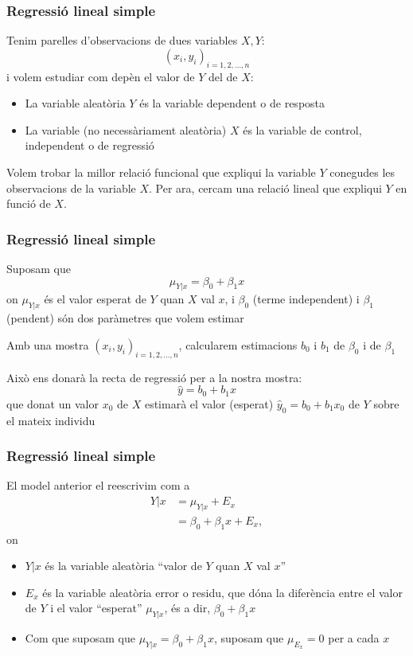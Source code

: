 \documentclass[12pt,t]{beamer}
\renewcommand{\emph}[1]{{\color{red}#1}}
\theoremstyle{plain}
\theoremstyle{definition}
\begin{document}
\begin{frame}
\frametitle{Regressió lineal simple}
Tenim parelles d'observacions de dues variables $X,Y$:
$$
(x_i,y_i)_{i=1,2,\ldots,n}
$$
i volem estudiar com depèn el valor de $Y$ del de $X$:
\medskip

\begin{itemize}
\item La variable aleatòria $Y$ és la variable \emph{dependent} o \emph{de resposta}

\item La variable (no necessàriament aleatòria) $X$ és la variable \emph{de control},
\emph{independent} o \emph{de regressió}
\end{itemize}
\bigskip

Volem trobar la millor relació funcional que  expliqui la variable $Y$ conegudes les observacions de la
variable $X$. Per ara, cercam una \emph{relació lineal} que expliqui $Y$ en funció de $X$.
\end{frame}

\begin{frame}
\frametitle{Regressió lineal simple}

Suposam que 
$$
\mu_{Y|x}=\beta_0+\beta_1 x
$$
on $\mu_{Y|x}$ és el valor esperat de $Y$ quan $X$ val $x$, i $\beta_0$
(\emph{terme independent}) i $\beta_1$ (\emph{pendent}) són dos
paràmetres que volem estimar
\medskip

Amb una mostra $(x_i,y_i)_{i=1,2,\ldots,n}$, calcularem estimacions $b_0$ i $b_1$ de
$\beta_0$ i de $\beta_1$
\medskip

Això ens donarà la \emph{recta de regressió} per a la nostra mostra:
$$
\widehat{y}=b_0+b_1 x
$$
que donat un valor $x_0$ de $X$ estimarà el valor (esperat) $\widehat{y}_0=b_0+b_1 x_0$ de $Y$ sobre el mateix individu
\end{frame}

\begin{frame}
\frametitle{Regressió lineal simple}

El model anterior el reescrivim com a
$$
\begin{array}{rl}
Y|x &=\mu_{Y|x}+ E_x\\
&=\beta_0+\beta_1 x+ E_x,
\end{array}
$$
on
\begin{itemize}
\item $Y|x$ és la variable aleatòria ``valor de $Y$ quan $X$ val $x$''
\medskip

\item $E_x$ és la variable aleatòria \emph{error} o \emph{residu}, que dóna la diferència entre el valor de $Y$ i el valor ``esperat'' $\mu_{Y|x}$, és a dir, $\beta_0+\beta_1 x$
\medskip

\item Com que suposam que $\mu_{Y|x}=\beta_0+\beta_1 x$, suposam que $\mu_{E_x}=0$ per a cada $x$
\end{itemize}

\end{frame}
\end{document}
